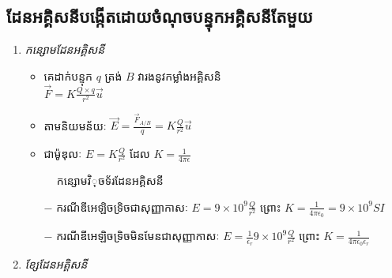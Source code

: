 \subsection{ដែនអគ្គិសនីបង្កើតដោយចំណុចបន្ទុកអគ្គិសនីតែមួយ}
\begin{enumerate}[m]
	\item \emph{\kml កន្សោមដែនអគ្គិសនី}
	\begin{multicols}{2}
		\begin{itemize}
			\item គេដាក់បន្ទុក $q$ ត្រង់ $B$ វារងនូវកម្លាំងអគ្គិសនិ\\ $\overrightarrow{F}=K\frac{Q\times q}{r^{2}}\vec{u}$
			\item តាមនិយមន័យៈ $\overrightarrow{E}=\frac{\overrightarrow{F}_{A/B}}{q}=K\frac{Q}{r^{2}}\vec{u}$
			\item ជាម៉ូឌុលៈ $E=K\frac{Q}{r^{2}}$ ដែល $K=\frac{1}{4\pi\epsilon}$
		\end{itemize}
		\begin{figure}[H]
		\centering
		\caption{កន្សោមវិុចទ័រ​​ដែនអគ្គិសនី}
	\end{figure}
	\end{multicols}
	\begin{itemize}
		\item [$-$] ករណីឌីអេឡិចទ្រិចជាសុញ្ញាកាសៈ $E=9\times10^{9}\frac{Q}{r^{2}}$ ព្រោះ $K=\frac{1}{4\pi\epsilon_{0}}=9\times10^{9}SI$
		\item [$-$] ករណីឌីអេឡិចទ្រិចមិនមែនជាសុញ្ញាកាសៈ $E=\frac{1}{\epsilon_{r}}9\times10^{9}\frac{Q}{r^{2}}$ ព្រោះ $K=\frac{1}{4\pi\epsilon_{0}\epsilon_{r}}$
	\end{itemize}
	\item \emph{\kml ខ្សែដែនអគ្គិសនី}

\end{enumerate}
